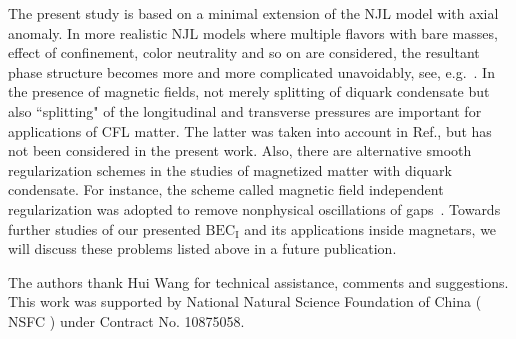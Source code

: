 \documentclass[prd, showpacs,nofootinbib,amsmath,amssymb,12pt]{revtex4}
\begin{document}
The present study is based on a minimal extension of the NJL model with axial anomaly.
In more realistic NJL models where multiple flavors with bare masses, effect of confinement, color neutrality and so on are considered,
the resultant phase structure becomes more and more complicated unavoidably, see, e.g.~\cite{basler2010role,Powell2011Axial,powell2013asymmetric}. 
In the presence of magnetic fields, not merely splitting of diquark condensate but also ``splitting" of the longitudinal and transverse pressures are important for applications of CFL matter. The latter was taken into account in Ref.\cite{paulucci2011equation}, but 
has not been considered in the present work. 
Also, there are alternative smooth regularization schemes in the studies of magnetized matter with diquark condensate. 
For instance, the scheme called magnetic field independent regularization was adopted to remove nonphysical oscillations of gaps~\cite{duarte2015bec,coppola2017magnetized}.
Towards further studies of our presented $\text{BEC}_\text{I}$ and its applications inside magnetars, we will discuss these problems listed above in a future publication.

\begin{acknowledgements} 
The authors  thank  Hui Wang  for  technical assistance, comments  and suggestions.
This work was supported by National Natural Science Foundation of
China ( NSFC ) under Contract No. 10875058.
\end{acknowledgements}

%


\end{document}
